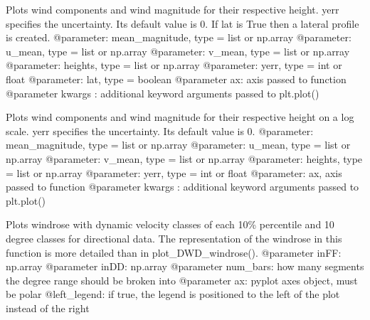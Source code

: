 \documentclass[letterpaper,10pt,english]{sphinxmanual}
\begin{document}

\begin{fulllineitems}
\label{\detokenize{index:windtunnel.plot_winddata}}
Plots wind components and wind magnitude for their respective height.
yerr specifies the uncertainty. Its default value is 0. If lat is True then
a lateral profile is created.
@parameter: mean\_magnitude, type = list or np.array
@parameter: u\_mean, type = list or np.array
@parameter: v\_mean, type = list or np.array
@parameter: heights, type = list or np.array
@parameter: yerr, type = int or float
@parameter: lat, type = boolean
@parameter ax: axis passed to function
@parameter kwargs : additional keyword arguments passed to plt.plot()

\end{fulllineitems}


\begin{fulllineitems}
\label{\detokenize{index:windtunnel.plot_winddata_log}}
Plots wind components and wind magnitude for their respective height on
a log scale. yerr specifies the uncertainty. Its default value is 0.
@parameter: mean\_magnitude, type = list or np.array
@parameter: u\_mean, type = list or np.array
@parameter: v\_mean, type = list or np.array
@parameter: heights, type = list or np.array
@parameter: yerr, type = int or float
@parameter: ax, axis passed to function
@parameter kwargs : additional keyword arguments passed to plt.plot()

\end{fulllineitems}


\begin{fulllineitems}
\label{\detokenize{index:windtunnel.plot_windrose}}
Plots windrose with dynamic velocity classes of each 10\% percentile and
10 degree classes for directional data. The representation of the windrose 
in this function is more detailed than in plot\_DWD\_windrose().
@parameter inFF: np.array
@parameter inDD: np.array
@parameter num\_bars: how many segments the degree range should be broken into
@parameter ax: pyplot axes object, must be polar
@left\_legend: if true, the legend is positioned to the left of the plot instead of the right

\end{fulllineitems}
\end{document}
